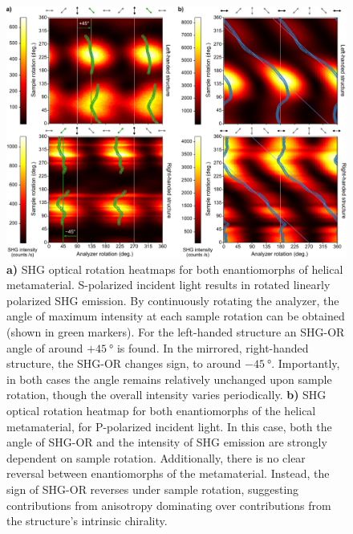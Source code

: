 \begin{figure}[htb!]	
    \centering	
    \includegraphics[scale=0.8]{./figures/results/OAinPlanarNanohelices/combined_data.pdf}

    \caption{\label{fig:results:OAinPlanarNanohelices:combined_data}
    \textbf{a)} SHG optical rotation heatmaps for both enantiomorphs of helical metamaterial. S-polarized incident light results in rotated linearly polarized SHG emission. By continuously rotating the analyzer, the angle of maximum intensity at each sample rotation can be obtained (shown in green markers). For the left-handed structure an SHG-OR angle of around $+\SI{45}{\degree}$ is found. In the mirrored, right-handed structure, the SHG-OR changes sign, to around $-\SI{45}{\degree}$. Importantly, in both cases the angle remains relatively unchanged upon sample rotation, though the overall intensity varies periodically. \textbf{b)} SHG optical rotation heatmap for both enantiomorphs of the helical metamaterial, for P-polarized incident light. In this case, both the angle of SHG-OR and the intensity of SHG emission are strongly dependent on sample rotation. Additionally, there is no clear reversal between enantiomorphs of the metamaterial. Instead, the sign of SHG-OR reverses under sample rotation, suggesting contributions from anisotropy dominating over contributions from the structure’s intrinsic chirality.}	
\end{figure}

